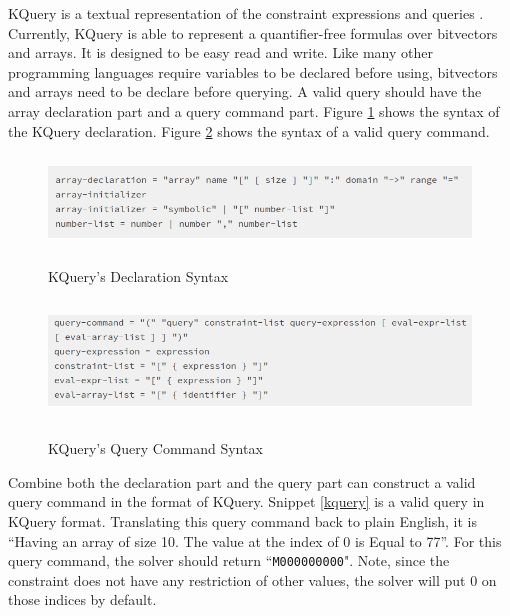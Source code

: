 KQuery is a textual representation of the constraint expressions and queries \cite{KQuery}. Currently, KQuery is able to represent a quantifier-free formulas over bitvectors and arrays. It is designed to be easy read and write. Like many other programming languages require variables to be declared before using, bitvectors and arrays need to be declare before querying. A valid query should have the array declaration part and a query command part. Figure \ref{kquery_declaration} shows the syntax of the KQuery declaration. Figure \ref{kquery_query} shows the syntax of a valid query command.

\begin{figure}[h]%
\begin{center}
{\mbox{\includegraphics[height=70pt]{figures/kquery_declaration.png}}}
\end{center}
\caption{\label{kquery_declaration}KQuery's Declaration Syntax}
\end{figure}

\begin{figure}[h]%
\begin{center}
{\mbox{\includegraphics[height=90pt]{figures/query_command.png}}}
\end{center}
\caption{\label{kquery_query}KQuery's Query Command Syntax}
\end{figure}

Combine both the declaration part and the query part can construct a valid query command in the format of KQuery. Snippet \ref{kquery} is a valid query in KQuery format. Translating this query command back to plain English, it is ``Having an array of size 10. The value at the index of 0 is Equal to 77''. For this query command, the solver should return ``\texttt{M000000000}". Note, since the constraint does not have any restriction of other values, the solver will put 0 on those indices by default.

